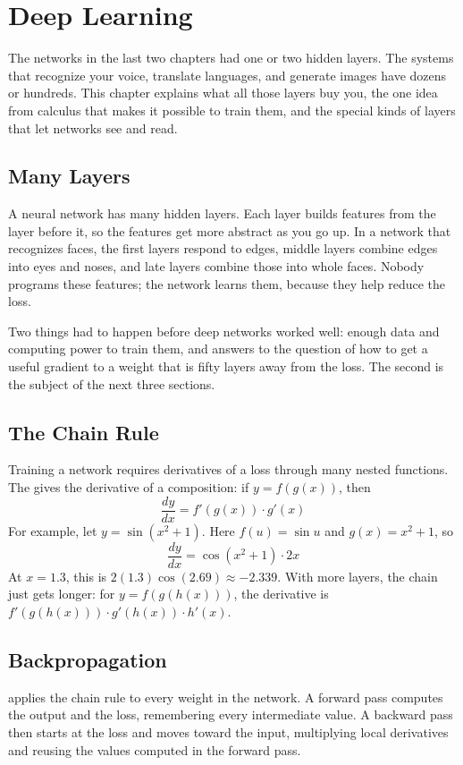 \chapter{Deep Learning}

The networks in the last two chapters had one or two hidden layers. The systems that recognize your voice,
translate languages, and generate images have dozens or hundreds. This chapter explains what all those layers buy
you, the one idea from calculus that makes it possible to train them, and the special kinds of layers that let
networks see and read.

\section{Many Layers}
A  neural network has many hidden layers. Each layer builds features from the layer before it, so
the features get more abstract as you go up. In a network that recognizes faces, the first layers respond to edges,
middle layers combine edges into eyes and noses, and late layers combine those into whole faces. Nobody programs
these features; the network learns them, because they help reduce the loss.

Two things had to happen before deep networks worked well: enough data and computing power to train them, and
answers to the question of how to get a useful gradient to a weight that is fifty layers away from the loss. The
second is the subject of the next three sections.

\section{The Chain Rule}
Training a network requires derivatives of a loss through many nested functions. The  gives the
derivative of a composition: if $y = f(g(x))$, then
$$\frac{dy}{dx} = f'(g(x)) \cdot g'(x)$$
For example, let $y = \sin(x^2 + 1)$. Here $f(u) = \sin u$ and $g(x) = x^2 + 1$, so
$$\frac{dy}{dx} = \cos(x^2 + 1) \cdot 2x$$
At $x = 1.3$, this is $2(1.3)\cos(2.69) \approx -2.339$. With more layers, the chain just gets longer:
for $y = f(g(h(x)))$, the derivative is $f'(g(h(x))) \cdot g'(h(x)) \cdot h'(x)$.

\section{Backpropagation}
 applies the chain rule to every weight in the network. A forward pass computes the output
and the loss, remembering every intermediate value. A backward pass then starts at the loss and moves toward the
input, multiplying local derivatives and reusing the values computed in the forward pass.

